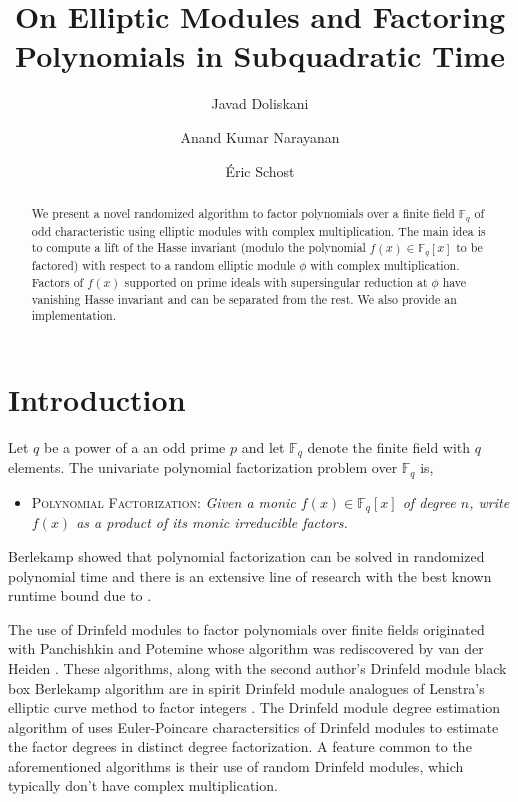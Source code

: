 \documentclass[12pt]{article}
\title{On Elliptic Modules and Factoring Polynomials in Subquadratic Time}
\author[1]{Javad Doliskani}
\author[2]{Anand Kumar Narayanan}
\author[3]{\'Eric Schost}
\affil[1]{\small Institute for Quantum Computing, University of Waterloo}
\affil[2]{\small Computing and Mathematical Sciences, Caltech}
\affil[3]{\small Computer Science Department, University of Waterloo}
\date{}
\theoremstyle{plain}
\theoremstyle{definition}
\def\F{\ensuremath{\mathbb{F}}}
\begin{document}
\maketitle

\begin{abstract}
	We present a novel randomized algorithm to factor polynomials over a finite field $\F_q$ of odd 
	characteristic using elliptic modules with complex multiplication. The main idea is to compute a
	lift of the Hasse invariant (modulo the polynomial $f(x) \in \F_q[x]$ to be factored) with 
	respect to a random elliptic module $\phi$ with complex multiplication. Factors of $f(x)$  
	supported on prime ideals with supersingular reduction at $\phi$ have vanishing Hasse invariant
	and can be separated from the rest. We also provide an implementation.
\end{abstract}



\section{Introduction}

Let $q$ be a power of a an odd prime $p$ and let $\F_q$ denote the finite field with $q$ elements. 
The univariate polynomial factorization problem over $\F_q$ is,
\begin{itemize}
	\item \textsc{Polynomial Factorization:} \textit{Given a monic $f(x) \in \mathbb{F}_q[x]$ of 
		degree $n$, write $f(x)$ as a product of its monic irreducible factors.}
\end{itemize}
Berlekamp showed that polynomial factorization can be solved in randomized polynomial time 
\cite{ber} and there is an extensive line of research \cite{cz,gs,ks,ku} with the best known 
runtime bound due to \cite{ku}.

The use of Drinfeld modules to factor polynomials over finite fields originated with Panchishkin 
and Potemine \cite{pp} whose algorithm was rediscovered by van der Heiden \cite{vdH}. These 
algorithms, along with the second author's Drinfeld module black box Berlekamp algorithm \cite{nar} 
are in spirit Drinfeld module analogues of Lenstra's elliptic curve method to factor integers 
\cite{len}. The Drinfeld module degree estimation algorithm of \cite{nar} uses Euler-Poincare 
charactersitics of Drinfeld modules to estimate the factor degrees in distinct degree 
factorization. A feature common to the aforementioned algorithms is their use of random Drinfeld 
modules, which typically don't have complex multiplication.
\end{document}
